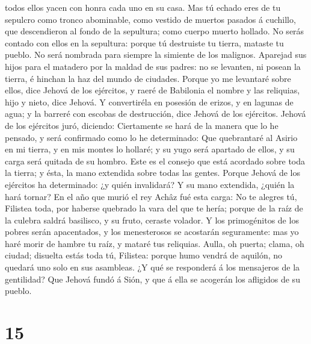 todos ellos yacen con honra cada uno en su casa.  Mas tú
echado eres de tu sepulcro como tronco abominable, como vestido de
muertos pasados á cuchillo, que descendieron al fondo de la sepultura;
como cuerpo muerto hollado.  No serás contado con ellos
en la sepultura: porque tú destruiste tu tierra, mataste tu pueblo. No
será nombrada para siempre la simiente de los malignos. 
Aparejad sus hijos para el matadero por la maldad de sus padres: no se
levanten, ni posean la tierra, é hinchan la haz del mundo de ciudades.
 Porque yo me levantaré sobre ellos, dice Jehová de los
ejércitos, y raeré de Babilonia el nombre y las reliquias, hijo y nieto,
dice Jehová.  Y convertiréla en posesión de erizos, y en
lagunas de agua; y la barreré con escobas de destrucción, dice Jehová de
los ejércitos.  Jehová de los ejércitos juró, diciendo:
Ciertamente se hará de la manera que lo he pensado, y será confirmado
como lo he determinado:  Que quebrantaré al Asirio en mi
tierra, y en mis montes lo hollaré; y su yugo será apartado de ellos, y
su carga será quitada de su hombro.  Este es el consejo
que está acordado sobre toda la tierra; y ésta, la mano extendida sobre
todas las gentes.  Porque Jehová de los ejércitos ha
determinado: ¿y quién invalidará? Y su mano extendida, ¿quién la hará
tornar?  En el año que murió el rey Achâz fué esta carga:
 No te alegres tú, Filistea toda, por haberse quebrado la
vara del que te hería; porque de la raíz de la culebra saldrá basilisco,
y su fruto, ceraste volador.  Y los primogénitos de los
pobres serán apacentados, y los menesterosos se acostarán seguramente:
mas yo haré morir de hambre tu raíz, y mataré tus reliquias.
 Aulla, oh puerta; clama, oh ciudad; disuelta estás toda
tú, Filistea: porque humo vendrá de aquilón, no quedará uno solo en sus
asambleas.  ¿Y qué se responderá á los mensajeros de la
gentilidad? Que Jehová fundó á Sión, y que á ella se acogerán los
afligidos de su pueblo.

\hypertarget{section-14}{%
\section{15}\label{section-14}}

